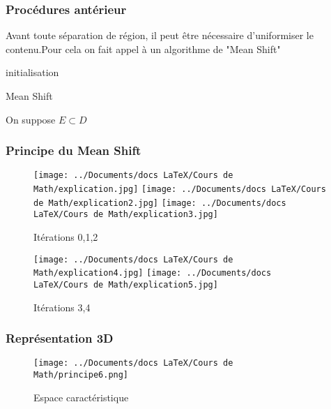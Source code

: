 \documentclass{beamer}
\newcommand{\K}{\mathbb{K}}
\begin{document}
\begin{frame}
\frametitle{Procédures antérieur}

Avant toute séparation de région, il peut être nécessaire d'uniformiser le contenu.Pour cela on fait appel à un algorithme de "Mean Shift"
\small
\begin{algorithm}[H]
\SetAlgoLined
{}
initialisation\;
\caption{Mean Shift}
\end{algorithm}
\normalsize
On suppose $E \subset D$\\
\end{frame}


\begin{frame}
\frametitle{Principe du Mean Shift}
\begin{figure}[h]
    \begin{minipage}[c]{.55\linewidth}
        \centering
        \texttt{[image: ../Documents/docs LaTeX/Cours de Math/explication.jpg]}
        \texttt{[image: ../Documents/docs LaTeX/Cours de Math/explication2.jpg]}
        \texttt{[image: ../Documents/docs LaTeX/Cours de Math/explication3.jpg]}
        \caption{Itérations 0,1,2}
    \end{minipage}
	\begin{minipage}[c]{.39\linewidth}
        \centering
        \texttt{[image: ../Documents/docs LaTeX/Cours de Math/explication4.jpg]}
        \texttt{[image: ../Documents/docs LaTeX/Cours de Math/explication5.jpg]}
        \caption{Itérations 3,4}
	\end{minipage}
\end{figure}
\end{frame}

\begin{frame}
\frametitle{Représentation 3D}
\begin{figure}
\texttt{[image: ../Documents/docs LaTeX/Cours de Math/principe6.png]}
\caption{Espace caractéristique}
\end{figure}
\end{frame}
\end{document}
